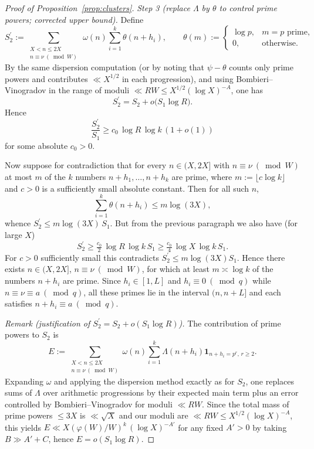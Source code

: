\documentclass[11pt]{amsart}
\theoremstyle{definition}
\theoremstyle{remark}
\numberwithin{equation}{section}
\begin{document}
\begin{proof}[Proof of Proposition~\ref{prop:clusters}]
\smallskip
\noindent\emph{Step 3 (replace $\Lambda$ by $\theta$ to control prime powers; corrected upper bound).}
Define
\[
S_2^{\prime}:=\sum_{\substack{X<n\le2X\\ n\equiv\nu\ (\bmod W)}}\ \omega(n)\sum_{i=1}^k\theta(n+h_i),\qquad \theta(m):=\begin{cases}\log p,& m=p\text{ prime},\\ 0,& \text{otherwise.}\end{cases}
\]
By the same dispersion computation (or by noting that $\psi-\theta$ counts only prime powers and contributes $\ll X^{1/2}$ in each progression), and using Bombieri–Vinogradov in the range of moduli $\ll RW\le X^{1/2}(\log X)^{-A}$, one has
\[
S_2^{\prime}=S_2+o\big(S_1\log R\big).
\]
Hence
\[
\frac{S_2^{\prime}}{S_1}\ge c_0\,\log R\,\log k\,(1+o(1))
\]
for some absolute $c_0>0$.

Now suppose for contradiction that for every $n\in(X,2X]$ with $n\equiv\nu\ (\bmod W)$ at most $m$ of the $k$ numbers $n+h_1,\dots,n+h_k$ are prime, where $m:=\lfloor c\log k\rfloor$ and $c>0$ is a sufficiently small absolute constant. Then for all such $n$,
\[
\sum_{i=1}^k\theta(n+h_i)\le m\log(3X),
\]
whence $S_2^{\prime}\le m\log(3X)\,S_1$. But from the previous paragraph we also have (for large $X$)
\[
S_2^{\prime}\ge \tfrac{c_0}{2}\,\log R\,\log k\,S_1\ge \tfrac{c_0}{4}\,\log X\,\log k\,S_1.
\]
For $c>0$ sufficiently small this contradicts $S_2^{\prime}\le m\log(3X)S_1$. Hence there exists $n\in(X,2X]$, $n\equiv\nu\ (\bmod W)$, for which at least $m\asymp \log k$ of the numbers $n+h_i$ are prime. Since $h_i\in[1,L]$ and $h_i\equiv0\ (\bmod q)$ while $n\equiv\nu\equiv a\ (\bmod q)$, all these primes lie in the interval $(n, n+L]$ and each satisfies $n+h_i\equiv a\ (\bmod q)$.

\smallskip
\noindent\emph{Remark (justification of $S_2^{\prime}=S_2+o(S_1\log R)$).}
The contribution of prime powers to $S_2$ is
\[
E:=\sum_{\substack{X<n\le2X\\ n\equiv\nu\ (\bmod W)}}\omega(n)\sum_{i=1}^k\Lambda(n+h_i)\mathbf 1_{n+h_i= p^r,\, r\ge2}.
\]
Expanding $\omega$ and applying the dispersion method exactly as for $S_2$, one replaces sums of $\Lambda$ over arithmetic progressions by their expected main term plus an error controlled by Bombieri–Vinogradov for moduli $\ll RW$. Since the total mass of prime powers $\le 3X$ is $\ll \sqrt X$ and our moduli are $\ll RW\le X^{1/2}(\log X)^{-A}$, this yields $E\ll X(\varphi(W)/W)^k\,(\log X)^{-A'}$ for any fixed $A'>0$ by taking $B\gg A'+C$, hence $E=o(S_1\log R)$.


\end{proof}
\end{document}
